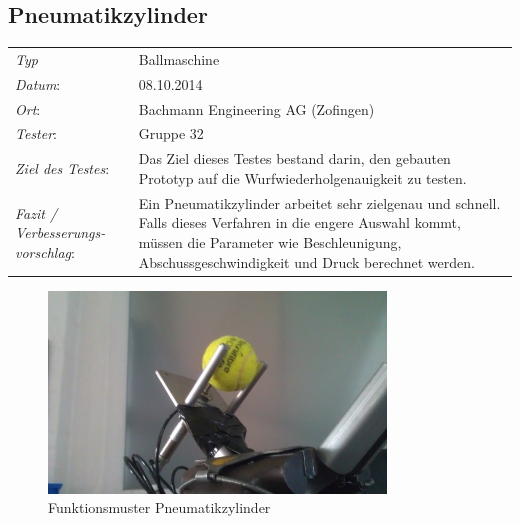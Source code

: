 \subsection{Pneumatikzylinder}

\begin{tabular}{p{3.6cm}p{\textwidth-3.6cm-0.7cm}}
\rule{0pt}{11pt}\textit{Typ}              & Ballmaschine \\ 
\rule{0pt}{11pt}\textit{Datum}:           & 08.10.2014   \\
\rule{0pt}{11pt}\textit{Ort}:             & Bachmann Engineering AG (Zofingen) \\
\rule{0pt}{11pt}\textit{Tester}:          & Gruppe 32\\
\rule{0pt}{11pt}\textit{Ziel des Testes}: & Das Ziel dieses Testes bestand darin, den gebauten Prototyp auf die Wurfwiederholgenauigkeit zu testen. \\
\rule{0pt}{11pt}\textit{Fazit / Verbesserungs-\newline vorschlag}: & Ein Pneumatikzylinder arbeitet sehr zielgenau und schnell. Falls dieses Verfahren in die engere Auswahl kommt, müssen die Parameter wie Beschleunigung, Abschussgeschwindigkeit und Druck berechnet werden.\\ 
\end{tabular}

\begin{figure}[h!]
	\includegraphics[width=0.8\textwidth]{Funktionstests/Bilder/PneumatikzylinderBild.jpg}
	\centering
	\caption{Funktionsmuster Pneumatikzylinder} 
\label{abb:PneumatikzylinderBild}
\end{figure}